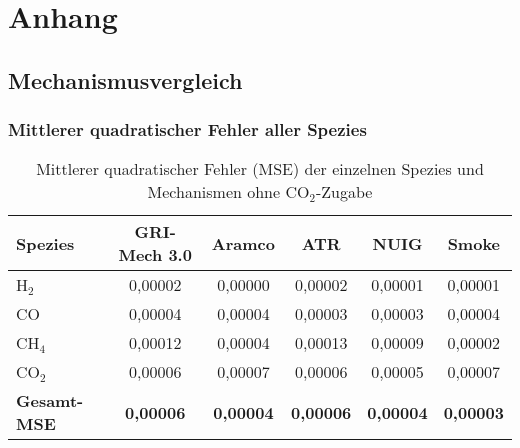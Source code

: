 \chapter{Anhang}
    \section{Mechanismusvergleich}
        \subsection{Mittlerer quadratischer Fehler aller Spezies}
            \begin{table}[H]
                \centering
                \caption{Mittlerer quadratischer Fehler (MSE) der einzelnen Spezies und Mechanismen ohne CO$_2$-Zugabe}
                \label{tab:mse_kein_co2}
                \begin{tabular}{lccccc}
                    \toprule
                    \textbf{Spezies} & \textbf{GRI-Mech 3.0} & \textbf{Aramco} & \textbf{ATR} & \textbf{NUIG} & \textbf{Smoke} \\
                    \midrule
                    H$_2$          & 0{,}00002 & 0{,}00000 & 0{,}00002 & 0{,}00001 & 0{,}00001 \\
                    CO             & 0{,}00004 & 0{,}00004 & 0{,}00003 & 0{,}00003 & 0{,}00004 \\
                    CH$_4$         & 0{,}00012 & 0{,}00004 & 0{,}00013 & 0{,}00009 & 0{,}00002 \\
                    CO$_2$         & 0{,}00006 & 0{,}00007 & 0{,}00006 & 0{,}00005 & 0{,}00007 \\
                    \midrule
                    \textbf{Gesamt-MSE} & \textbf{0{,}00006} & \textbf{0{,}00004} & \textbf{0{,}00006} & \textbf{0{,}00004} & \textbf{0{,}00003} \\
                    \bottomrule
                \end{tabular}
            \end{table}
